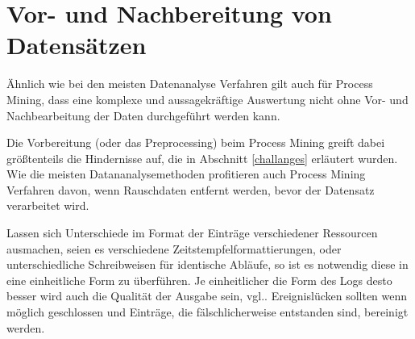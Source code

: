 
\section{Vor- und Nachbereitung von Datensätzen}
Ähnlich wie bei den meisten Datenanalyse Verfahren gilt auch für Process Mining, dass eine komplexe und aussagekräftige Auswertung nicht ohne Vor- und Nachbearbeitung der Daten durchgeführt werden kann.

Die Vorbereitung (oder das Preprocessing) beim Process Mining greift dabei größtenteils die Hindernisse auf, die in Abschnitt \ref{challanges} erläutert wurden. Wie die meisten Datananalysemethoden profitieren auch Process Mining Verfahren davon, wenn Rauschdaten entfernt werden, bevor der Datensatz verarbeitet wird. 

Lassen sich Unterschiede im Format der Einträge verschiedener Ressourcen ausmachen, seien es verschiedene Zeitstempfelformattierungen, oder unterschiedliche Schreibweisen für identische Abläufe, so ist es notwendig diese in eine einheitliche Form zu überführen. Je einheitlicher die Form des Logs desto besser wird auch die Qualität der Ausgabe sein, vgl.\cite{PMinAction}. Ereignislücken sollten wenn möglich geschlossen und Einträge, die fälschlicherweise entstanden sind, bereinigt werden.

